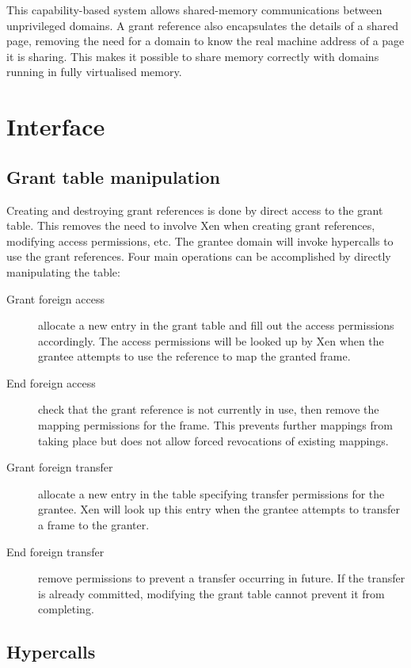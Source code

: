 \documentclass[11pt,twoside,final,openright]{report}
\begin{document}
This capability-based system allows shared-memory communications
between unprivileged domains.  A grant reference also encapsulates the
details of a shared page, removing the need for a domain to know the
real machine address of a page it is sharing.  This makes it possible
to share memory correctly with domains running in fully virtualised
memory.

\section{Interface}

\subsection{Grant table manipulation}

Creating and destroying grant references is done by direct access to
the grant table.  This removes the need to involve Xen when creating
grant references, modifying access permissions, etc.  The grantee
domain will invoke hypercalls to use the grant references.  Four main
operations can be accomplished by directly manipulating the table:

\begin{description}
\item[Grant foreign access] allocate a new entry in the grant table
  and fill out the access permissions accordingly.  The access
  permissions will be looked up by Xen when the grantee attempts to
  use the reference to map the granted frame.
\item[End foreign access] check that the grant reference is not
  currently in use, then remove the mapping permissions for the frame.
  This prevents further mappings from taking place but does not allow
  forced revocations of existing mappings.
\item[Grant foreign transfer] allocate a new entry in the table
  specifying transfer permissions for the grantee.  Xen will look up
  this entry when the grantee attempts to transfer a frame to the
  granter.
\item[End foreign transfer] remove permissions to prevent a transfer
  occurring in future.  If the transfer is already committed,
  modifying the grant table cannot prevent it from completing.
\end{description}

\subsection{Hypercalls}
\end{document}
